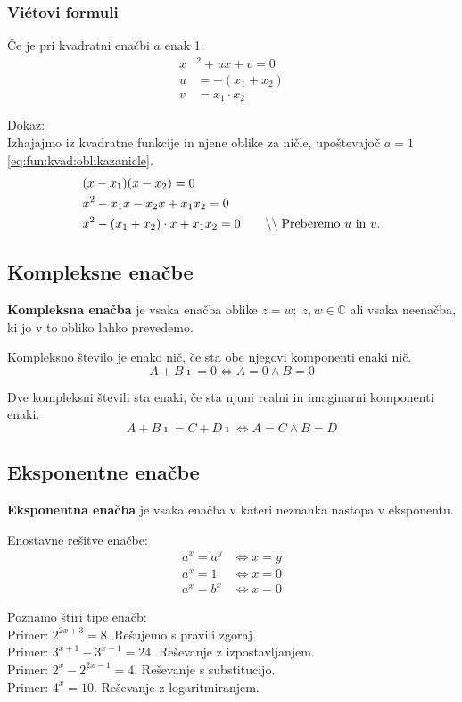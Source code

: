 \documentclass[a4paper,oneside,12pt,fleqn]{article}
\def\C{\ensuremath{\mathbb C}}
\newcommand\krat\cdot
\newcommand{\comment}[1]{\ensuremath{\qquad\backslash\backslash\;}\textnormal{#1}}
\newcommand{\ii}{\ensuremath{\imath}}
\renewcommand\iff\Leftrightarrow
\numberwithin{equation}{section}
\begin{document}
\subsubsection{Vi\'{e}tovi formuli}
\label{sec:enac:kvad:viet}
Če je pri kvadratni enačbi $a$ enak 1:
\begin{align*}
  x&^2 + ux + v = 0 \\
  u& = -(x_1 + x_2) \\
  v& = x_1 \krat x_2
\end{align*}

Dokaz:\\
Izhajajmo iz kvadratne funkcije in njene oblike za ničle, upoštevajoč $a = 1$
\eqref{eq:fun:kvad:oblikazanicle}.
\begin{align*}
  &(x-x_1)(x-x_2) =  0 \\
  &x^2 - x_1x-x_2x +x_1x_2 = 0 \\
  &x^2 - (x_1+x_2) \krat x + x_1x_2 = 0 \comment{Preberemo $u$ in $v$.}
\end{align*}

\subsection{Kompleksne enačbe}
\label{sec:enac:kompl}
\textbf{Kompleksna enačba} je vsaka enačba oblike $z = w;\; z, w \in \C$ ali vsaka neenačba, ki jo v
to obliko lahko prevedemo.

Kompleksno število je enako nič, če sta obe njegovi komponenti enaki nič.
\[ A + B\ii = 0 \iff A = 0 \land B = 0 \]

Dve kompleksni števili sta enaki, če sta njuni realni in imaginarni komponenti enaki.
\[ A + B\ii = C + D\ii \iff A = C \land B = D \]

\subsection{Eksponentne enačbe}
\label{sec:enac:eks}
\textbf{Eksponentna enačba} je vsaka enačba v kateri neznanka nastopa v eksponentu.

Enostavne rešitve enačbe:
\begin{align*}
  a^x = a^y &\iff x = y \\
  a^x = 1 &\iff x = 0 \\
  a^x = b^x &\iff x = 0
\end{align*}

Poznamo štiri tipe enačb: \\
Primer: $2^{2x+3} = 8$. Rešujemo s pravili zgoraj.\\
Primer: $3^{x+1} - 3^{x-1} = 24$. Reševanje z izpostavljanjem.\\
Primer: $2^x - 2^{2x-1} = 4$. Reševanje s substitucijo.\\
Primer: $4^x = 10$. Reševanje z logaritmiranjem.
\end{document}
